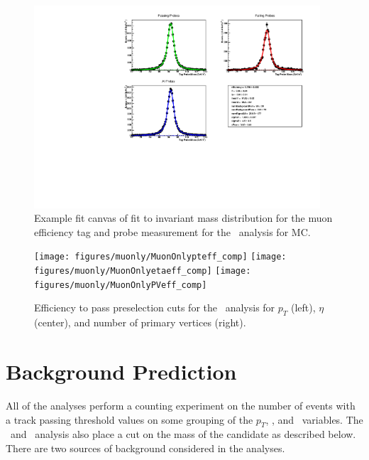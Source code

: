 \begin{figure}
 \begin{center}
  \includegraphics[width=0.95\textwidth]{figures/muonly/FitCanvasMCEtaBin6}
 \end{center}
 \caption{Example fit canvas of fit to invariant mass distribution for
the muon efficiency tag and probe measurement for the \muononly\ analysis for MC.
    \label{fig:MuOnlyTagProbeFit}}
\end{figure}

\begin{figure}
 \begin{center}
  \texttt{[image: figures/muonly/MuonOnlypteff\_comp]}
  \texttt{[image: figures/muonly/MuonOnlyetaeff\_comp]}
  \texttt{[image: figures/muonly/MuonOnlyPVeff\_comp]}
 \end{center}
 \caption{Efficiency to pass preselection cuts for the \muononly\ analysis
   for $p_T$ (left), $\eta$ (center), and number of primary vertices
   (right).
   \label{fig:MuOnlyTagProbeEff}}
\end{figure}



\section{Background Prediction \label{BackPred}}
All of the analyses perform a counting experiment on the number of events with a track passing threshold values on some grouping of the $p_T$, \invbeta, 
and \dedx\ variables. The \tktof\  and \tkonly\ analysis also place a cut on the mass of the candidate as described below. There are two sources
of background considered in the analyses. 

